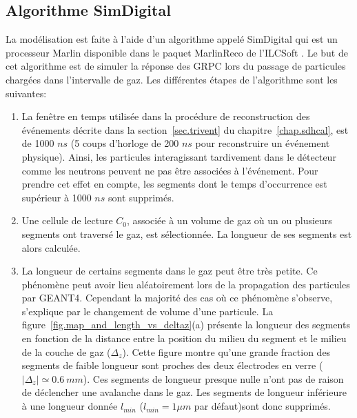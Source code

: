 \subsection{Algorithme SimDigital}
\label{sec.algo}
La modélisation est faite à l'aide d'un algorithme appelé SimDigital qui est un processeur Marlin \cite{marlin} disponible dans le paquet MarlinReco \cite{marlinreco} de l'ILCSoft \cite{ilcsoft}. Le but de cet algorithme est de simuler la réponse des GRPC lors du passage de particules chargées dans l'intervalle de gaz. Les différentes étapes de l’algorithme sont les suivantes:
\begin{enumerate}[~~1-]
\item La fenêtre en temps utilisée dans la procédure de reconstruction des événements décrite dans la section~\ref{sec.trivent} du chapitre~\ref{chap.sdhcal}, est de 1000 $ns$ (5 coups d'horloge de 200 $ns$ pour reconstruire un événement physique). Ainsi, les particules interagissant tardivement dans le détecteur comme les neutrons peuvent ne pas être associées à l’événement. Pour prendre cet effet en compte, les segments dont le temps d’occurrence est supérieur à 1000 $ns$ sont supprimés.
\item \label{it.start} Une cellule de lecture $C_0$, associée à un volume de gaz où un ou plusieurs segments ont traversé le gaz, est sélectionnée. La longueur de ses segments est alors calculée.
\item La longueur de certains segments dans le gaz peut être très petite. Ce phénomène peut avoir lieu aléatoirement lors de la propagation des particules par GEANT4. Cependant la majorité des cas où ce phénomène s'observe, s'explique par le changement de volume d'une particule. La figure~\ref{fig.map_and_length_vs_deltaz}(a) présente la longueur des segments en fonction de la distance entre la position du milieu du segment et le milieu de la couche de gaz ($\Delta_z$). Cette figure montre qu'une grande fraction des segments de faible longueur sont proches des deux électrodes en verre ($|\Delta_z|\simeq0.6~mm$). Ces segments de longueur presque nulle n'ont pas de raison de déclencher une avalanche dans le gaz. Les segments de longueur inférieure à une longueur donnée $l_{min}$ ($l_{min}=1 \mu m$ par défaut)sont donc supprimés.
  \begin{figure}[!ht]

\end{figure}
\end{enumerate}
